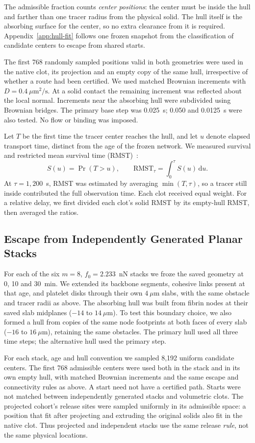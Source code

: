 The admissible fraction counts \emph{center positions}: the center must be inside the hull and farther than one tracer radius from the physical solid. The hull itself is the absorbing surface for the center, so no extra clearance from it is required. Appendix~\ref{app:hull-fit} follows one frozen snapshot from the classification of candidate centers to escape from shared starts.

The first 768 randomly sampled positions valid in both geometries were used in the native clot, its projection and an empty copy of the same hull, irrespective of whether a route had been certified. We used matched Brownian increments with $D=0.4~\mu\mathrm m^2/\mathrm s$. At a solid contact the remaining increment was reflected about the local normal. Increments near the absorbing hull were subdivided using Brownian bridges. The primary base step was 0.025~s; 0.050 and 0.0125~s were also tested. No flow or binding was imposed.

Let $T$ be the first time the tracer center reaches the hull, and let $u$ denote elapsed transport time, distinct from the age of the frozen network. We measured survival and restricted mean survival time (RMST)~\cite{Redner2001,RoystonParmar2013}:
\begin{equation}
  S(u)=\Pr(T>u),\qquad
  \mathrm{RMST}_{\tau}=\int_0^\tau S(u)\,\mathrm du .
  \label{eq:hull-rmst}
\end{equation}
At $\tau=1{,}200$~s, RMST was estimated by averaging $\min(T,\tau)$, so a tracer still inside contributed the full observation time. Each clot received equal weight. For a relative delay, we first divided each clot's solid RMST by its empty-hull RMST, then averaged the ratios.

\subsection{Escape from Independently Generated Planar Stacks}
For each of the six $m=8$, $f_0=2.233$~nN stacks we froze the saved geometry at 0, 10 and 30~min. We extended its backbone segments, cohesive links present at that age, and platelet disks through their own $4~\mu\mathrm m$ slabs, with the same obstacle and tracer radii as above. The absorbing hull was built from fibrin nodes at their saved slab midplanes ($-14$ to $14~\mu\mathrm m$). To test this boundary choice, we also formed a hull from copies of the same node footprints at both faces of every slab ($-16$ to $16~\mu\mathrm m$), retaining the same obstacles. The primary hull used all three time steps; the alternative hull used the primary step.

For each stack, age and hull convention we sampled 8,192 uniform candidate centers. The first 768 admissible centers were used both in the stack and in its own empty hull, with matched Brownian increments and the same escape and connectivity rules as above. A start need not have a certified path. Starts were not matched between independently generated stacks and volumetric clots. The projected cohort's release sites were sampled uniformly in its admissible space: a position that fit after projecting and extruding the original solids also fit in the native clot. Thus projected and independent stacks use the same release \emph{rule}, not the same physical locations.
